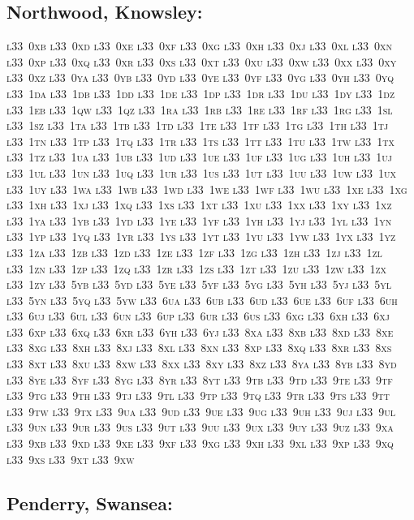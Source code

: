 \documentclass[12pt,a4paper]{article}
\begin{document}
\subsection*{Northwood, Knowsley:}

\textsc{\lowercase{%
L33~0XB	L33~0XD	L33~0XE	L33~0XF	L33~0XG	L33~0XH
L33~0XJ	L33~0XL	L33~0XN	L33~0XP	L33~0XQ	L33~0XR
L33~0XS	L33~0XT	L33~0XU	L33~0XW	L33~0XX	L33~0XY
L33~0XZ	L33~0YA	L33~0YB	L33~0YD	L33~0YE	L33~0YF
L33~0YG	L33~0YH	L33~0YQ	L33~1DA	L33~1DB	L33~1DD
L33~1DE	L33~1DP	L33~1DR	L33~1DU	L33~1DY	L33~1DZ
L33~1EB	L33~1QW	L33~1QZ	L33~1RA	L33~1RB	L33~1RE
L33~1RF	L33~1RG	L33~1SL	L33~1SZ	L33~1TA	L33~1TB
L33~1TD	L33~1TE	L33~1TF	L33~1TG	L33~1TH	L33~1TJ
L33~1TN	L33~1TP	L33~1TQ	L33~1TR	L33~1TS	L33~1TT
L33~1TU	L33~1TW	L33~1TX	L33~1TZ	L33~1UA	L33~1UB
L33~1UD	L33~1UE	L33~1UF	L33~1UG	L33~1UH	L33~1UJ
L33~1UL	L33~1UN	L33~1UQ	L33~1UR	L33~1US	L33~1UT
L33~1UU	L33~1UW	L33~1UX	L33~1UY	L33~1WA	L33~1WB
L33~1WD	L33~1WE	L33~1WF	L33~1WU	L33~1XE	L33~1XG
L33~1XH	L33~1XJ	L33~1XQ	L33~1XS	L33~1XT	L33~1XU
L33~1XX	L33~1XY	L33~1XZ	L33~1YA	L33~1YB	L33~1YD
L33~1YE	L33~1YF	L33~1YH	L33~1YJ	L33~1YL	L33~1YN
L33~1YP	L33~1YQ	L33~1YR	L33~1YS	L33~1YT	L33~1YU
L33~1YW	L33~1YX	L33~1YZ	L33~1ZA	L33~1ZB	L33~1ZD
L33~1ZE	L33~1ZF	L33~1ZG	L33~1ZH	L33~1ZJ	L33~1ZL
L33~1ZN	L33~1ZP	L33~1ZQ	L33~1ZR	L33~1ZS	L33~1ZT
L33~1ZU	L33~1ZW	L33~1ZX	L33~1ZY	L33~5YB	L33~5YD
L33~5YE	L33~5YF	L33~5YG	L33~5YH	L33~5YJ	L33~5YL
L33~5YN	L33~5YQ	L33~5YW	L33~6UA	L33~6UB	L33~6UD
L33~6UE	L33~6UF	L33~6UH	L33~6UJ	L33~6UL	L33~6UN
L33~6UP	L33~6UR	L33~6US	L33~6XG	L33~6XH	L33~6XJ
L33~6XP	L33~6XQ	L33~6XR	L33~6YH	L33~6YJ	L33~8XA
L33~8XB	L33~8XD	L33~8XE	L33~8XG	L33~8XH	L33~8XJ
L33~8XL	L33~8XN	L33~8XP	L33~8XQ	L33~8XR	L33~8XS
L33~8XT	L33~8XU	L33~8XW	L33~8XX	L33~8XY	L33~8XZ
L33~8YA	L33~8YB	L33~8YD	L33~8YE	L33~8YF	L33~8YG
L33~8YR	L33~8YT	L33~9TB	L33~9TD	L33~9TE	L33~9TF
L33~9TG	L33~9TH	L33~9TJ	L33~9TL	L33~9TP	L33~9TQ
L33~9TR	L33~9TS	L33~9TT	L33~9TW	L33~9TX	L33~9UA
L33~9UD	L33~9UE	L33~9UG	L33~9UH	L33~9UJ	L33~9UL
L33~9UN	L33~9UR	L33~9US	L33~9UT	L33~9UU	L33~9UX
L33~9UY	L33~9UZ	L33~9XA	L33~9XB	L33~9XD	L33~9XE
L33~9XF	L33~9XG	L33~9XH	L33~9XL	L33~9XP	L33~9XQ
L33~9XS	L33~9XT	L33~9XW			
}}

\subsection*{Penderry, Swansea:}
\end{document}
